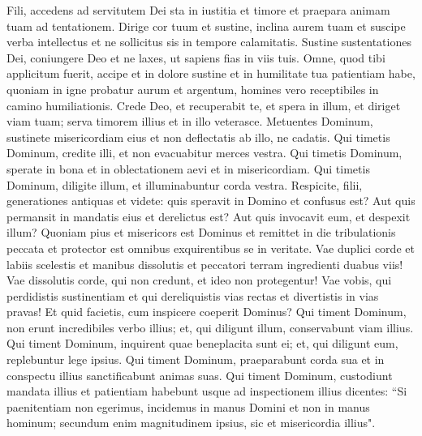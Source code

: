 \begin{biblechapter}  
\verse Fili, accedens ad servitutem Dei sta in iustitia et timore et praepara animam tuam ad tentationem. 
\verse Dirige cor tuum et sustine, inclina aurem tuam et suscipe verba intellectus et ne sollicitus sis in tempore calamitatis. 
\verse Sustine sustentationes Dei, coniungere Deo et ne laxes, ut sapiens fias in viis tuis. 
\verse Omne, quod tibi applicitum fuerit, accipe et in dolore sustine et in humilitate tua patientiam habe, 
\verse quoniam in igne probatur aurum et argentum, homines vero receptibiles in camino humiliationis. 
\verse Crede Deo, et recuperabit te, et spera in illum, et diriget viam tuam; serva timorem illius et in illo veterasce. 
\verse Metuentes Dominum, sustinete misericordiam eius et non deflectatis ab illo, ne cadatis. 
\verse Qui timetis Dominum, credite illi, et non evacuabitur merces vestra. 
\verse Qui timetis Dominum, sperate in bona et in oblectationem aevi et in misericordiam. 
\verse Qui timetis Dominum, diligite illum, et illuminabuntur corda vestra. 
\verse Respicite, filii, generationes antiquas et videte: quis speravit in Domino et confusus est? 
\verse Aut quis permansit in mandatis eius et derelictus est? Aut quis invocavit eum, et despexit illum? 
\verse Quoniam pius et misericors est Dominus et remittet in die tribulationis peccata et protector est omnibus exquirentibus se in veritate. 
\verse Vae duplici corde et labiis scelestis et manibus dissolutis et peccatori terram ingredienti duabus viis! 
\verse Vae dissolutis corde, qui non credunt, et ideo non protegentur! 
\verse Vae vobis, qui perdidistis sustinentiam et qui dereliquistis vias rectas et divertistis in vias pravas! 
\verse Et quid facietis, cum inspicere coeperit Dominus? 
\verse Qui timent Dominum, non erunt incredibiles verbo illius; et, qui diligunt illum, conservabunt viam illius. 
\verse Qui timent Dominum, inquirent quae beneplacita sunt ei; et, qui diligunt eum, replebuntur lege ipsius. 
\verse Qui timent Dominum, praeparabunt corda sua et in conspectu illius sanctificabunt animas suas. 
\verse Qui timent Dominum, custodiunt mandata illius et patientiam habebunt usque ad inspectionem illius 
\verse dicentes: “Si paenitentiam non egerimus, incidemus in manus Domini et non in manus hominum; 
\verse secundum enim magnitudinem ipsius, sic et misericordia illius". 
\end{biblechapter}

